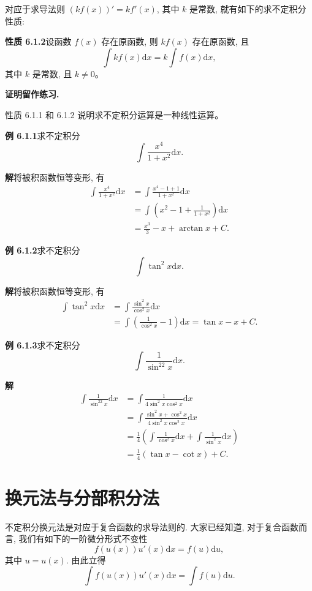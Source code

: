 \documentclass[UTF8,12pt,a4paper,fontset=fandol]{ctexart}
\begin{document}
对应于求导法则 $(kf(x))'=kf'(x)$, 其中 $k$ 是常数, 就有如下的求不定积分性质:

\noindent\textbf{性质 6.1.2}\quad 设函数 $f(x)$ 存在原函数, 则 $kf(x)$ 存在原函数, 且
\[
  \int kf(x)\mathrm dx=k\int f(x)\mathrm dx,
\]
其中 $k$ 是常数, 且 $k\ne0$。

\noindent\textbf{证明留作练习.}

性质 6.1.1 和 6.1.2 说明求不定积分运算是一种线性运算。

\noindent\textbf{例 6.1.1}\quad 求不定积分
\[
  \int\frac{x^4}{1+x^2}\mathrm dx.
\]

\noindent\textbf{解}\quad 将被积函数恒等变形, 有
\[
\begin{aligned}
  \int\frac{x^4}{1+x^2}\mathrm dx
  &=
  \int\frac{x^4-1+1}{1+x^2}\mathrm dx\\
  &=
  \int\left(x^2-1+\frac1{1+x^2}\right)\mathrm dx\\
  &=
  \frac{x^3}{3}-x+\arctan x+C.
\end{aligned}
\]

\noindent\textbf{例 6.1.2}\quad 求不定积分
\[
  \int\tan^2x\mathrm dx.
\]

\noindent\textbf{解}\quad 将被积函数恒等变形, 有
\[
\begin{aligned}
  \int\tan^2x\mathrm dx
  &=
  \int\frac{\sin^2x}{\cos^2x}\mathrm dx\\
  &=
  \int\left(\frac1{\cos^2x}-1\right)\mathrm dx
  =
  \tan x-x+C.
\end{aligned}
\]

\noindent\textbf{例 6.1.3}\quad 求不定积分
\[
  \int\frac1{\sin^22x}\mathrm dx.
\]

\noindent\textbf{解}\quad
\[
\begin{aligned}
  \int\frac1{\sin^22x}\mathrm dx
  &=
  \int\frac1{4\sin^2x\cos^2x}\mathrm dx\\
  &=
  \int\frac{\sin^2x+\cos^2x}{4\sin^2x\cos^2x}\mathrm dx\\
  &=
  \frac14\left(\int\frac1{\cos^2x}\mathrm dx+\int\frac1{\sin^2x}\mathrm dx\right)\\
  &=
  \frac14(\tan x-\cot x)+C.
\end{aligned}
\]

\section{换元法与分部积分法}

不定积分换元法是对应于复合函数的求导法则的. 大家已经知道, 对于复合函数而言, 我们有如下的一阶微分形式不变性
\[
  f(u(x))u'(x)\mathrm dx=f(u)\mathrm du,
\]
其中 $u=u(x)$. 由此立得
\begin{equation}
  \int f(u(x))u'(x)\mathrm dx=\int f(u)\mathrm du.
  \tag{6.2.1}
\end{equation}
\end{document}
